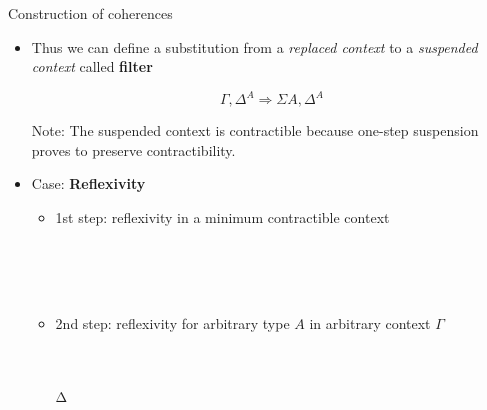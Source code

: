 \documentclass[12pt, mathserif,handout]{beamer}
\begin{document}
\begin{frame}[allowframebreaks,t]{Construction of coherences}
\begin{itemize}
\item Thus we can define a substitution from a \emph{replaced context} to a
  \emph{suspended context} called \textbf{filter}

$$\Gamma, \Delta^{A} \Rightarrow \Sigma A , \Delta^{A}$$

Note: The suspended context is contractible because one-step
suspension proves to preserve contractibility.

\framebreak

\item Case: \textbf{Reflexivity}

\begin{itemize}

\item 1st step: reflexivity in a minimum contractible context
\begin{code}\>\<%
\\
\> \AgdaSymbol{:}  \AgdaSymbol{\{}\AgdaSymbol{\}} \AgdaSymbol{(}    \AgdaSymbol{)}\<%
\\
\> \AgdaSymbol{=}  \<%
\\
\>\<\end{code}

\item 2nd step: reflexivity for arbitrary type $A$ in arbitrary
  context $\Gamma$

\begin{code}\>\<%
\\
\> \<[11]%
\>[11]\AgdaSymbol{:} \AgdaSymbol{\{} \AgdaSymbol{:} \AgdaSymbol{\}(} \AgdaSymbol{:}  \AgdaSymbol{)} \<[33]%
\>[33]\<%
\\
\>[9]\<[11]%
\>[11]  \AgdaSymbol{(} \AgdaSymbol{\{}Δ \AgdaSymbol{=} \AgdaSymbol{\}}  \AgdaSymbol{(}    \AgdaSymbol{))}\<%
\\
\>  \<[11]%
\>[11]\AgdaSymbol{=}   \<%
\\
\>\<\end{code}

\end{itemize}


\end{itemize}
\end{frame}
\end{document}

